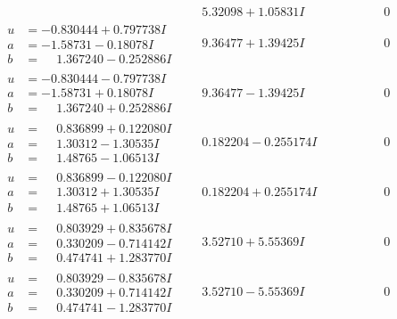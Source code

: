 \documentclass[1p]{elsarticle_modified}
\theoremstyle{definition}
\begin{document}
$$\begin{array}{c|c|c}
 & \phantom{-}5.32098 + 1.05831 I & \phantom{-0.000000 } 0 \\ \hline\begin{aligned}
u &= -0.830444 + 0.797738 I \\
a &= -1.58731 - 0.18078 I \\
b &= \phantom{-}1.367240 - 0.252886 I\end{aligned}
 & \phantom{-}9.36477 + 1.39425 I & \phantom{-0.000000 } 0 \\ \hline\begin{aligned}
u &= -0.830444 - 0.797738 I \\
a &= -1.58731 + 0.18078 I \\
b &= \phantom{-}1.367240 + 0.252886 I\end{aligned}
 & \phantom{-}9.36477 - 1.39425 I & \phantom{-0.000000 } 0 \\ \hline\begin{aligned}
u &= \phantom{-}0.836899 + 0.122080 I \\
a &= \phantom{-}1.30312 - 1.30535 I \\
b &= \phantom{-}1.48765 - 1.06513 I\end{aligned}
 & \phantom{-}0.182204 - 0.255174 I & \phantom{-0.000000 } 0 \\ \hline\begin{aligned}
u &= \phantom{-}0.836899 - 0.122080 I \\
a &= \phantom{-}1.30312 + 1.30535 I \\
b &= \phantom{-}1.48765 + 1.06513 I\end{aligned}
 & \phantom{-}0.182204 + 0.255174 I & \phantom{-0.000000 } 0 \\ \hline\begin{aligned}
u &= \phantom{-}0.803929 + 0.835678 I \\
a &= \phantom{-}0.330209 - 0.714142 I \\
b &= \phantom{-}0.474741 + 1.283770 I\end{aligned}
 & \phantom{-}3.52710 + 5.55369 I & \phantom{-0.000000 } 0 \\ \hline\begin{aligned}
u &= \phantom{-}0.803929 - 0.835678 I \\
a &= \phantom{-}0.330209 + 0.714142 I \\
b &= \phantom{-}0.474741 - 1.283770 I\end{aligned}
 & \phantom{-}3.52710 - 5.55369 I & \phantom{-0.000000 } 0 \\ \hline\begin{aligned}

\end{aligned}
\end{array}$$
\end{document}
